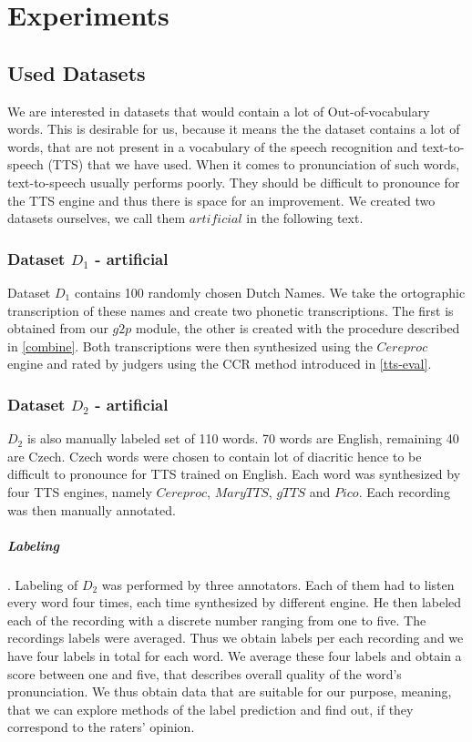 \chapter{Experiments}
\section{Used Datasets}
\label{data-desc}
We are interested in datasets that would contain a lot of Out-of-vocabulary words.
This is desirable for us, because it means the the dataset contains a lot of words, that are not present in a vocabulary of the speech recognition and text-to-speech (TTS) that we have used.
When it comes to pronunciation of such words, text-to-speech usually performs poorly.
They should be difficult to pronounce for the TTS engine and thus there is space for an improvement.
We created two datasets ourselves, we call them $artificial$ in the following text.
\subsection{Dataset \textbf{$D_1$} - artificial}
Dataset $D_1$ contains 100 randomly chosen Dutch Names.
We take the ortographic transcription of these names and create two phonetic transcriptions.
The first is obtained from our $g2p$ module, the other is created with the procedure described in \ref{combine}.
Both transcriptions were then synthesized using the $Cereproc$ engine and rated by judgers using the CCR method introduced in \ref{tts-eval}.
\subsection{Dataset \textbf{$D_2$} - artificial}
$D_2$ is also manually labeled set of 110 words.
70 words are English, remaining 40 are Czech.
Czech words were chosen to contain lot of diacritic hence to be difficult to pronounce for TTS trained on English.
Each word was synthesized by four TTS engines, namely $Cereproc$, $MaryTTS$, $gTTS$ and $Pico$.
Each recording was then manually annotated.
\paragraph{Labeling}. Labeling of $D_2$  was performed by three annotators. Each of them had to listen every word four times, each time synthesized by different engine. He then labeled each of the recording with a discrete number ranging from one to five. The recordings labels were averaged. Thus we obtain labels per each recording and we have four labels in total for each word. We average these four labels and obtain a score between one and five, that describes overall quality of the word's pronunciation.
We thus obtain data that are suitable for our purpose, meaning, that we can explore methods of the label prediction and find out, if they correspond to the raters' opinion.
